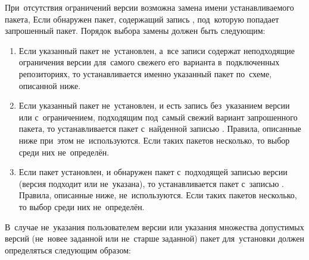 При~отсутствия ограничений версии возможна замена имени устанавливаемого пакета,  
Если обнаружен  пакет, содержащий запись , под~которую попадает запрошенный пакет.
Порядок выбора замены должен быть следующим:

\begin{enumerate}

\item {
Если указанный пакет не~установлен, а~все записи  содержат неподходящие ограничения версии для~самого свежего его~варианта в~подключенных репозиториях,
то устанавливается именно указанный пакет по~схеме, описанной ниже.
}

\item {
Если указанный пакет не~установлен, и есть запись  без~указанием версии или с~ограничением, подходящим под~самый свежий вариант запрошенного пакета,
то устанавливается пакет с~найденной записью .
Правила, описанные ниже при~этом не~используются.
Если таких пакетов несколько, то выбор среди них не~определён.
}

\item {
Если пакет установлен, и обнаружен пакет с~подходящей записью версии (версия подходит или не~указана),
то устанавливается пакет с~записью .
Правила, описанные ниже, не~используются.
Если таких пакетов несколько, то выбор среди них не~определён.
}

\end{enumerate}

В~случае не~указания пользователем версии или указания множества допустимых версий (не~новее заданной или не~старше заданной)
пакет для~установки должен определяться следующим образом:


